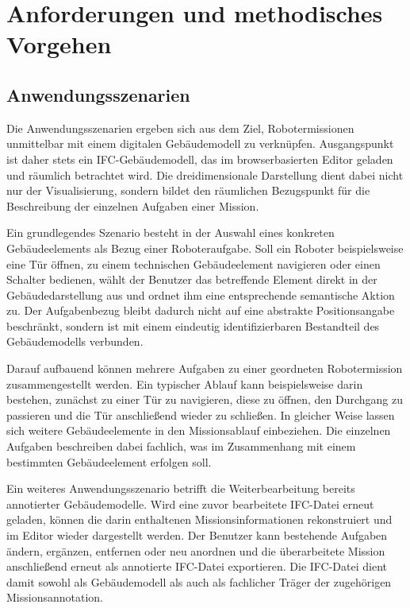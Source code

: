\section{Anforderungen und methodisches Vorgehen}\label{sec:Anforderungen}

\subsection{Anwendungsszenarien}

Die Anwendungsszenarien ergeben sich aus dem Ziel, Robotermissionen unmittelbar mit einem digitalen
Gebäudemodell zu verknüpfen. Ausgangspunkt ist daher stets ein IFC-Gebäudemodell, das im
browserbasierten Editor geladen und räumlich betrachtet wird. Die dreidimensionale Darstellung dient
dabei nicht nur der Visualisierung, sondern bildet den räumlichen Bezugspunkt für die Beschreibung
der einzelnen Aufgaben einer Mission.

Ein grundlegendes Szenario besteht in der Auswahl eines konkreten Gebäudeelements als Bezug einer
Roboteraufgabe. Soll ein Roboter beispielsweise eine Tür öffnen, zu einem technischen Gebäudeelement
navigieren oder einen Schalter bedienen, wählt der Benutzer das betreffende Element direkt in der
Gebäudedarstellung aus und ordnet ihm eine entsprechende semantische Aktion zu. Der Aufgabenbezug
bleibt dadurch nicht auf eine abstrakte Positionsangabe beschränkt, sondern ist mit einem eindeutig
identifizierbaren Bestandteil des Gebäudemodells verbunden.

Darauf aufbauend können mehrere Aufgaben zu einer geordneten Robotermission zusammengestellt werden.
Ein typischer Ablauf kann beispielsweise darin bestehen, zunächst zu einer Tür zu navigieren, diese
zu öffnen, den Durchgang zu passieren und die Tür anschließend wieder zu schließen. In gleicher
Weise lassen sich weitere Gebäudeelemente in den Missionsablauf einbeziehen. Die einzelnen Aufgaben
beschreiben dabei fachlich, was im Zusammenhang mit einem bestimmten Gebäudeelement erfolgen
soll.

Ein weiteres Anwendungsszenario betrifft die Weiterbearbeitung bereits annotierter Gebäudemodelle.
Wird eine zuvor bearbeitete IFC-Datei erneut geladen, können die darin enthaltenen
Missionsinformationen rekonstruiert und im Editor wieder dargestellt werden. Der Benutzer kann
bestehende Aufgaben ändern, ergänzen, entfernen oder neu anordnen und die überarbeitete Mission
anschließend erneut als annotierte IFC-Datei exportieren. Die IFC-Datei dient damit sowohl als
Gebäudemodell als auch als fachlicher Träger der zugehörigen Missionsannotation.

